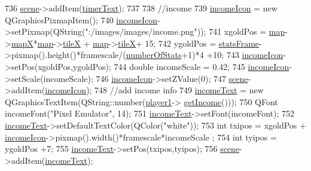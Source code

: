 \begin{DoxyCode}
736     \hyperlink{class_game_a8119e3b9a632906c6808fa294b46a92a}{scene}->addItem(\hyperlink{class_game_a21d038c2747c61d3b5a2a3d8f1764086}{timerText});
737 
738     \textcolor{comment}{//income}
739     \hyperlink{class_game_a54671774169c28677974ee423a147c39}{incomeIcon} = \textcolor{keyword}{new} QGraphicsPixmapItem();
740     \hyperlink{class_game_a54671774169c28677974ee423a147c39}{incomeIcon}->setPixmap(QString(\textcolor{stringliteral}{":/images/images/income.png"}));
741     xgoldPos = \hyperlink{class_game_acef3a39fdf14be2c980b0dc11e7be402}{map}->\hyperlink{class_map_acfd20721da29a2e353598555e23e12f0}{mapX}*\hyperlink{class_game_acef3a39fdf14be2c980b0dc11e7be402}{map}->\hyperlink{class_map_af2aa425dd22aba483ae973c4a15fe934}{tileX} + \hyperlink{class_game_acef3a39fdf14be2c980b0dc11e7be402}{map}->\hyperlink{class_map_af2aa425dd22aba483ae973c4a15fe934}{tileX}+ 15;
742     ygoldPos = \hyperlink{class_game_a3b40718d348c0f12af63a3f428924ab4}{statsFrame}->pixmap().height()*framescale/(\hyperlink{class_game_af041d097dc2350360c7951e5a41bc48a}{numberOfStats}+1)*4 +10;
743     \hyperlink{class_game_a54671774169c28677974ee423a147c39}{incomeIcon}->setPos(xgoldPos,ygoldPos);
744     \textcolor{keywordtype}{double} incomeScale = 0.42;
745     \hyperlink{class_game_a54671774169c28677974ee423a147c39}{incomeIcon}->setScale(incomeScale);
746     \hyperlink{class_game_a54671774169c28677974ee423a147c39}{incomeIcon}->setZValue(0);
747     \hyperlink{class_game_a8119e3b9a632906c6808fa294b46a92a}{scene}->addItem(\hyperlink{class_game_a54671774169c28677974ee423a147c39}{incomeIcon});
748     \textcolor{comment}{//add income info}
749     \hyperlink{class_game_a7d139b0ba0ef2a94966b138d5e77a034}{incomeText} = \textcolor{keyword}{new} QGraphicsTextItem(QString::number(\hyperlink{class_game_ad8a7cc146f99c7ec5b7c3c25d73f118c}{player1}->
      \hyperlink{class_player1_a1bc2927827b94667b6f2d115ae95fb75}{getIncome}()));
750     QFont incomeFont(\textcolor{stringliteral}{"Pixel Emulator"}, 14);
751     \hyperlink{class_game_a7d139b0ba0ef2a94966b138d5e77a034}{incomeText}->setFont(incomeFont);
752     \hyperlink{class_game_a7d139b0ba0ef2a94966b138d5e77a034}{incomeText}->setDefaultTextColor(QColor(\textcolor{stringliteral}{"white"}));
753     \textcolor{keywordtype}{int} txipos = xgoldPos + \hyperlink{class_game_a54671774169c28677974ee423a147c39}{incomeIcon}->pixmap().width()*framescale*incomeScale ;
754     \textcolor{keywordtype}{int} tyipos = ygoldPos +7;
755     \hyperlink{class_game_a7d139b0ba0ef2a94966b138d5e77a034}{incomeText}->setPos(txipos,tyipos);
756     \hyperlink{class_game_a8119e3b9a632906c6808fa294b46a92a}{scene}->addItem(\hyperlink{class_game_a7d139b0ba0ef2a94966b138d5e77a034}{incomeText});

\end{DoxyCode}
